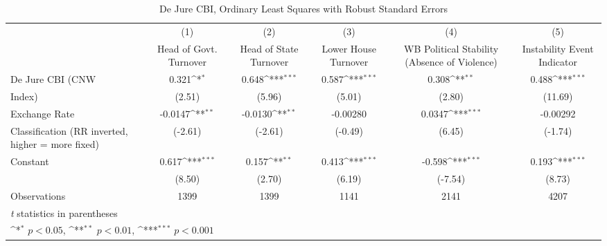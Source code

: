 \begin{table}[htbp]\centering
\def\sym#1{\ifmmode^{#1}\else\(^{#1}\)\fi}
\caption{De Jure CBI, Ordinary Least Squares with Robust Standard Errors \label{multIndOLSDJ}}
\begin{tabular}{l*{5}{c}}
\hline\hline
                    &\multicolumn{1}{c}{(1)}&\multicolumn{1}{c}{(2)}&\multicolumn{1}{c}{(3)}&\multicolumn{1}{c}{(4)}&\multicolumn{1}{c}{(5)}\\
                    &\multicolumn{1}{c}{Head of Govt. Turnover}&\multicolumn{1}{c}{Head of State Turnover}&\multicolumn{1}{c}{Lower House Turnover}&\multicolumn{1}{c}{WB Political Stability (Absence of Violence)}&\multicolumn{1}{c}{Instability Event Indicator}\\
\hline
De Jure CBI (CNW    &       0.321\sym{*}  &       0.648\sym{***}&       0.587\sym{***}&       0.308\sym{**} &       0.488\sym{***}\\
Index)              &      (2.51)         &      (5.96)         &      (5.01)         &      (2.80)         &     (11.69)         \\
[1em]
Exchange Rate       &     -0.0147\sym{**} &     -0.0130\sym{**} &    -0.00280         &      0.0347\sym{***}&    -0.00292         \\
Classification (RR inverted, higher = more fixed)&     (-2.61)         &     (-2.61)         &     (-0.49)         &      (6.45)         &     (-1.74)         \\
[1em]
Constant            &       0.617\sym{***}&       0.157\sym{**} &       0.413\sym{***}&      -0.598\sym{***}&       0.193\sym{***}\\
                    &      (8.50)         &      (2.70)         &      (6.19)         &     (-7.54)         &      (8.73)         \\
\hline
Observations        &        1399         &        1399         &        1141         &        2141         &        4207         \\
\hline\hline
\multicolumn{6}{l}{\footnotesize \textit{t} statistics in parentheses}\\
\multicolumn{6}{l}{\footnotesize \sym{*} \(p<0.05\), \sym{**} \(p<0.01\), \sym{***} \(p<0.001\)}\\
\end{tabular}
\end{table}
